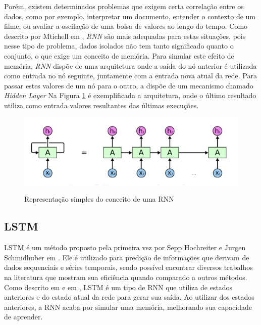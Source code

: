 Porém, existem determinados problemas que exigem certa correlação entre os dados, como por exemplo, interpretar um documento, entender o contexto de um filme, ou avaliar a oscilação de uma bolsa de valores ao longo do tempo. Como descrito por Mtichell em \cite{Mitchell_1997}, \textit{\acrshort{RNN}} são mais adequadas para estas situações, pois nesse tipo de problema, dados isolados não tem tanto significado quanto o conjunto, o que exige um conceito de memória. Para simular este efeito de memória, \textit{\acrshort{RNN}} dispõe de uma arquitetura onde a saída do nó anterior é utilizada como entrada no nó seguinte, juntamente com a entrada nova atual da rede. Para passar estes valores de um nó para o outro, a  dispõe de um mecanismo chamado \textit{Hidden Layer} Na Figura \ref{figure:rnn} é exemplificada a arquitetura, onde o último resultado utiliza como entrada valores resultantes das últimas execuções.

\begin{figure}[htbp]
    \centering
    \includegraphics[scale=0.4]{rnnExample.png}
    \label{figure:rnn}
    \caption[Representação simples do conceito de um RNN]{Representação simples do conceito de uma RNN \footnotemark}
\end{figure}

\subsection{\acrfull{LSTM}}

\acrshort{LSTM} é um método proposto pela primeira vez por Sepp Hochreiter e Jurgen Schmidhuber em \cite{Sepp_1997}. Ele é utilizado para predição de informações que derivam de dados sequenciais e séries temporais, sendo possível encontrar diversos trabalhos na literatura que mostram sua eficiência quando comparado a outros métodos. Como descrito em \cite{Zainab_2018} e em \cite{Xiaolei_2015}, \acrshort{LSTM} é um tipo de \acrshort{RNN} que utiliza de estados anteriores e do estado atual da rede para gerar sua saída. Ao utilizar dos estados anteriores, a \acrshort{RNN} acaba por simular uma memória, melhorando sua capacidade de aprender. 

